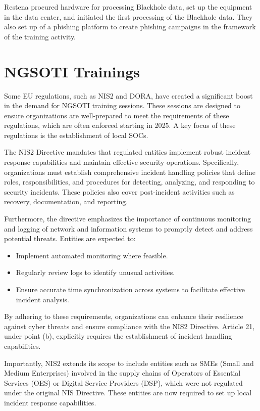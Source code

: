 Restena procured hardware for processing Blackhole data, set up the equipment in the data center, and initiated the first processing of the Blackhole data.
They also set up of a phishing platform to create phishing campaigns in the framework of the training activity.

\chapter{NGSOTI Trainings}\label{training}
Some EU regulations, such as NIS2 and DORA, have created a significant boost in the demand for NGSOTI training sessions. These sessions are designed to ensure organizations are well-prepared to meet the requirements of these regulations, which are often enforced starting in 2025. A key focus of these regulations is the establishment of local SOCs.

The NIS2 Directive mandates that regulated entities implement robust incident response capabilities and maintain effective security operations. Specifically, organizations must establish comprehensive incident handling policies that define roles, responsibilities, and procedures for detecting, analyzing, and responding to security incidents. These policies also cover post-incident activities such as recovery, documentation, and reporting.

Furthermore, the directive emphasizes the importance of continuous monitoring and logging of network and information systems to promptly detect and address potential threats. Entities are expected to:

\begin{itemize}
	\item Implement automated monitoring where feasible.
	\item Regularly review logs to identify unusual activities.
	\item Ensure accurate time synchronization across systems to facilitate effective incident analysis.
\end{itemize}

By adhering to these requirements, organizations can enhance their resilience against cyber threats and ensure compliance with the NIS2 Directive. Article 21, under point (b), explicitly requires the establishment of incident handling capabilities.

Importantly, NIS2 extends its scope to include entities such as SMEs (Small and Medium Enterprises) involved in the supply chains of Operators of Essential Services (OES) or Digital Service Providers (DSP), which were not regulated under the original NIS Directive. These entities are now required to set up local incident response capabilities.

